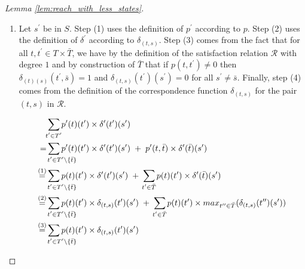 \documentclass{llncs}
\newcommand{\ssum}[2]{\sum\limits_{\mathclap{#1}^{#2}}}%
\begin{document}
\begin{proof}[Lemma \ref{lem:reach_with_less_states}]
\begin{enumerate}
\begin{enumerate}
		\item
			Let $s^\prime$ be in $S$. 
			Step (1) uses the definition of $p^\prime$ according to $p$.
			Step (2) uses the definition of $\delta^\prime$ according to $\delta_{(t,s)}$.
			Step (3) comes from the fact that for all $t, t^\prime \in T \times \bar{T}$, 
			we have by the definition of the satisfaction relation $\mathcal{R}$ with degree $1$
			and by construction of $\bar{T}$
			that if $p(t,t^\prime) \neq 0$ then $\delta_{(t)(s)}(t^\prime, \bar{s}) = 1$ and $\delta_{(t,s)}(t^\prime)(s^\prime) = 0$ for all $s^\prime \neq \bar{s}$.
			Finally, step (4) comes from the definition of the correspondence function $\delta_{(t,s)}$ for the pair $(t,s)$ in $\mathcal{R}$.
	\par\noindent
	\allowdisplaybreaks
	\begin{align*}
		& \ssum{t^\prime \in T^\prime}{} p^\prime(t)(t^\prime) \times \delta^\prime(t^\prime)(s^\prime)
\\
		=
		&
		\ssum{\hspace{0.7cm}t^\prime \in T^\prime \setminus \{\bar{t}\}}{} p^\prime(t)(t^\prime) \times \delta^\prime(t^\prime)(s^\prime)
		\hspace{0.1cm} + \hspace{0.1cm} 
		p^\prime(t, \bar{t}) \times \delta^\prime(\bar{t})(s^\prime)
\\
		\stackrel{(1)}{=} &
		\ssum{\hspace{0.7cm}t^\prime \in T^\prime \setminus \{\bar{t}\}}{} p(t)(t^\prime) \times \delta^\prime(t^\prime)(s^\prime)
		\hspace{0.1cm} + \hspace{0.1cm} 
		\ssum{\hspace{0cm}t^\prime \in \bar{T}}{} p(t)(t^\prime) \times \delta^\prime(\bar{t})(s^\prime)
\\
		\stackrel{(2)}{=} &
		\ssum{\hspace{0.7cm}t^\prime \in T^\prime \setminus \{\bar{t}\}}{} p(t)(t^\prime) \times \delta_{(t,s)}(t^\prime)(s^\prime)
		\hspace{0.1cm} + \hspace{0.1cm} 
		\ssum{\hspace{0cm}t^\prime \in \bar{T}}{} p(t)(t^\prime) \times max_{t^{\prime\prime} \in \bar{T}}(\delta_{(t,s)}(t^{\prime\prime})(s^\prime))
\\
		\stackrel{(3)}{=} &
		\ssum{\hspace{0.7cm}t^\prime \in T^\prime \setminus \{\bar{t}\}}{} p(t)(t^\prime) \times \delta_{(t,s)}(t^\prime)(s^\prime)

\end{align*}
\end{enumerate}
\end{enumerate}
\end{proof}
\end{document}
